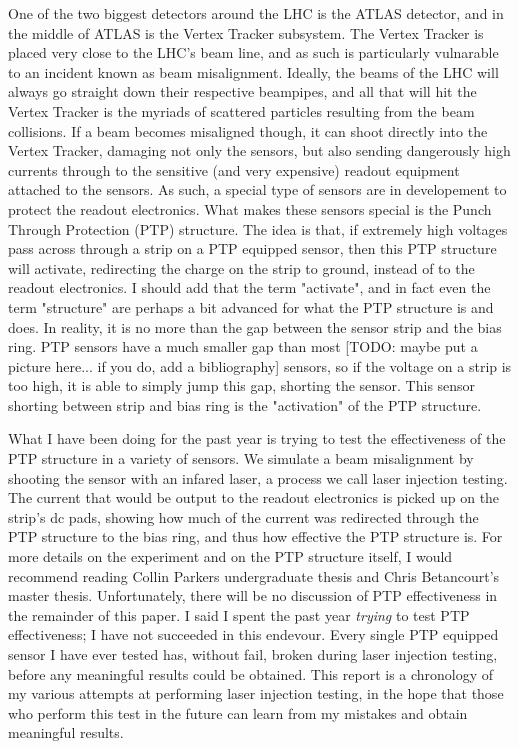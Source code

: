 \documentclass{report}
\begin{document}
        One of the two biggest detectors around the LHC is the ATLAS detector, and in the middle of ATLAS is the Vertex Tracker subsystem. The Vertex Tracker is placed very close to the LHC's beam line, and as such is particularly vulnarable to an incident known as beam misalignment. Ideally, the beams of the LHC will always go straight down their respective beampipes, and all that will hit the Vertex Tracker is the myriads of scattered particles resulting from the beam collisions. If a beam becomes misaligned though, it can shoot directly into the Vertex Tracker, damaging not only the sensors, but also sending dangerously high currents through to the sensitive (and very expensive) readout equipment attached to the sensors. As such, a special type of sensors are in developement to protect the readout electronics. What makes these sensors special is the Punch Through Protection (PTP) structure. The idea is that, if extremely high voltages pass across through a strip on a PTP equipped sensor, then this PTP structure will activate, redirecting the charge on the strip to ground, instead of to the readout electronics. I should add that the term "activate", and in fact even the term "structure" are perhaps a bit advanced for what the PTP structure is and does. In reality, it is no more than the gap between the sensor strip and the bias ring. PTP sensors have a much smaller gap than most [TODO: maybe put a picture here... if you do, add a bibliography] sensors, so if the voltage on a strip is too high, it is able to simply jump this gap, shorting the sensor. This sensor shorting between strip and bias ring is the "activation" of the PTP structure.

        What I have been doing for the past year is trying to test the effectiveness of the PTP structure in a variety of sensors. We simulate a beam misalignment by shooting the sensor with an infared laser, a process we call laser injection testing. The current that would be output to the readout electronics is picked up on the strip's dc pads, showing how much of the current was redirected through the PTP structure to the bias ring, and thus how effective the PTP structure is. For more details on the experiment and on the PTP structure itself, I would recommend reading Collin Parkers undergraduate thesis and Chris Betancourt's master thesis. Unfortunately, there will be no discussion of PTP effectiveness in the remainder of this paper. I said I spent the past year \textit{trying} to test PTP effectiveness; I have not succeeded in this endevour. Every single PTP equipped sensor I have ever tested has, without fail, broken during laser injection testing, before any meaningful results could be obtained. This report is a chronology of my various attempts at performing laser injection testing, in the hope that those who perform this test in the future can learn from my mistakes and obtain meaningful results. 
\end{document}
